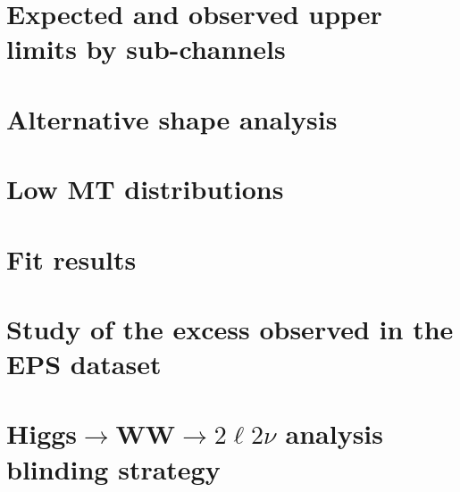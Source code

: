 \documentclass{cmspaper}
\begin{document}
\clearpage

  \section{Expected and observed upper limits by sub-channels}
     \label{app:subchannels}

\clearpage
  \section{Alternative shape analysis}
     \label{app:appendix_altshape}

\clearpage
  \section{Low MT distributions}
     \label{app:appendix_lowmt}
 
\clearpage
  \section{Fit results}
     \label{app:appendix_fit}

\clearpage
  \section{Study of the excess observed in the EPS dataset}
     \label{app:limits_eps}

%  
\section{Higgs$\to$WW$\to2\ell2\nu$ analysis blinding strategy}
     \label{app:blinding}
     
\end{document}
